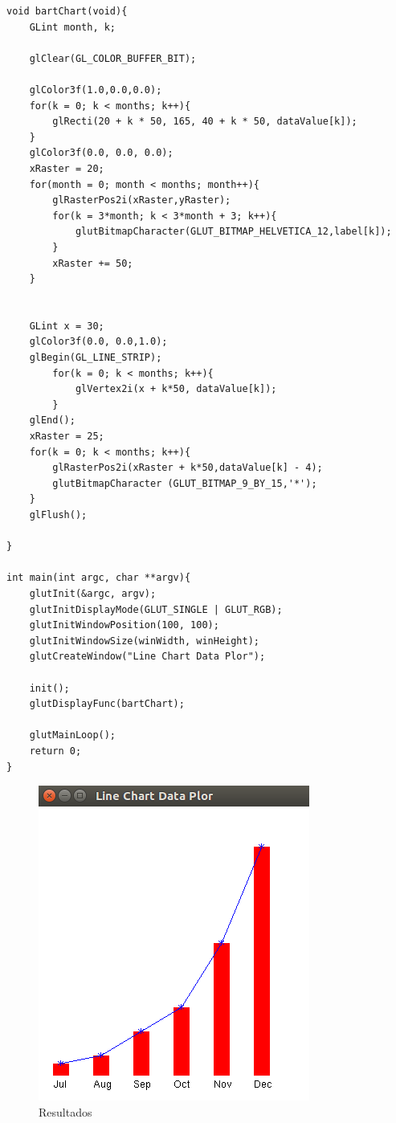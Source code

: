 \documentclass[a4paper,12pt]{article}
\begin{document}
\begin{enumerate}
\begin{lstlisting}
void bartChart(void){
	GLint month, k;

	glClear(GL_COLOR_BUFFER_BIT);

	glColor3f(1.0,0.0,0.0);
	for(k = 0; k < months; k++){
		glRecti(20 + k * 50, 165, 40 + k * 50, dataValue[k]);
	}
	glColor3f(0.0, 0.0, 0.0);
	xRaster = 20;
	for(month = 0; month < months; month++){
		glRasterPos2i(xRaster,yRaster);
		for(k = 3*month; k < 3*month + 3; k++){
			glutBitmapCharacter(GLUT_BITMAP_HELVETICA_12,label[k]);
		}
		xRaster += 50;
	}


	GLint x = 30;
    glColor3f(0.0, 0.0,1.0);
    glBegin(GL_LINE_STRIP);
        for(k = 0; k < months; k++){
            glVertex2i(x + k*50, dataValue[k]);
        }
    glEnd();
	xRaster = 25;
    for(k = 0; k < months; k++){
        glRasterPos2i(xRaster + k*50,dataValue[k] - 4);
        glutBitmapCharacter (GLUT_BITMAP_9_BY_15,'*');
    }
    glFlush();
	
}

int main(int argc, char **argv){
	glutInit(&argc, argv);
	glutInitDisplayMode(GLUT_SINGLE | GLUT_RGB);
	glutInitWindowPosition(100, 100);
	glutInitWindowSize(winWidth, winHeight);
	glutCreateWindow("Line Chart Data Plor");

	init();
	glutDisplayFunc(bartChart);

	glutMainLoop();
	return 0;
}
\end{lstlisting}

\begin{figure}[H]
 \centering
 \includegraphics[scale = 0.5]{3.png}
 \caption{Resultados}
\end{figure}


\end{enumerate}
\end{document}

